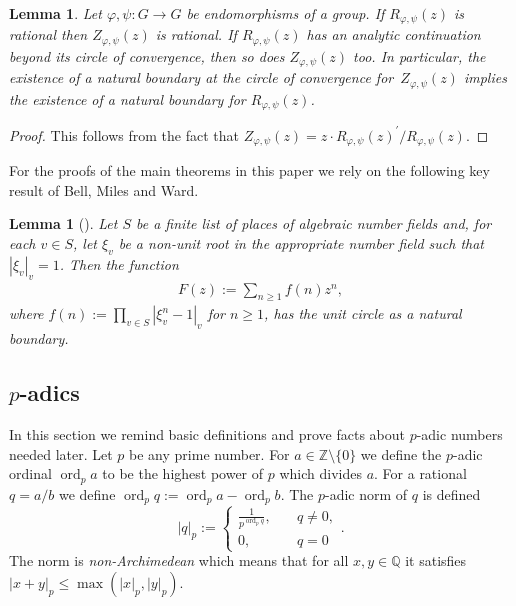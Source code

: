 \documentclass[oneside]{amsart}
\def\Z{\mathbb{Z}}
\def\Q{\mathbb{Q}}
\def\ord{\operatorname{ord}}
\newtheorem{lem}[thm]{Lemma}
\begin{document}
\begin{lem} \label{thm:logarithmic-derivative}
  Let $\varphi, \psi: G \to G$ be endomorphisms of a group.
  If $R_{\varphi, \psi}(z)$ is rational then $Z_{\varphi, \psi}(z)$ is rational.
  If $R_{\varphi, \psi}(z)$ has an analytic continuation beyond
  its circle of convergence, then so does $Z_{\varphi, \psi}(z)$ too.
  In particular, the existence of a natural boundary
  at the circle of convergence for~$Z_{\varphi, \psi}(z)$ implies the
  existence of a natural boundary for $R_{\varphi, \psi}(z)$.
\end{lem}
\begin{proof}
  This follows from the fact that $Z_{\varphi, \psi}(z) = z \cdot R_{\varphi, \psi}(z)^{'}/R_{\varphi, \psi}(z)$.
\end{proof}

For the proofs of the main theorems in this paper we rely on the
following key result of Bell, Miles and Ward.
\begin{lem}[] \label{thm:BMW-lemma17}
  Let $S$ be a finite list of places of algebraic number fields and, for each $v \in S$,
  let $\xi_v$ be a non-unit root in the appropriate number field such that $|\xi_v|_v = 1$.
  Then the function
  \begin{align*}
    F(z) := \sum_{n \geq 1} f(n) z^n,
  \end{align*}
  where $f(n) := \prod_{v \in S} |\xi_v^n-1|_v$ for $n \geq 1$,
  has the unit circle as a natural boundary.
\end{lem}



\subsection{$p$-adics}

In this section we remind basic definitions and prove facts about $p$-adic numbers needed later.
Let $p$ be any prime number. For $a \in \Z \setminus \{0\}$ we define the $p$-adic ordinal $\ord_p a$
to be the highest power of $p$ which divides $a$.
For a rational $q = a/b$ we define $\ord_p q := \ord_p a - \ord_p b$.
The $p$-adic norm of $q$ is defined
\[
  \left| q \right|_p := \begin{cases} \frac{1}{p^{\ord_p q}}, \quad &q \neq 0,\\ 0, \quad &q=0 \end{cases}.
\]
The norm is \emph{non-Archimedean} which means that for all $x, y \in \Q$
it satisfies $\left| x+y \right|_p \leq \max\left( |x|_p, |y|_p \right)$.
\end{document}

